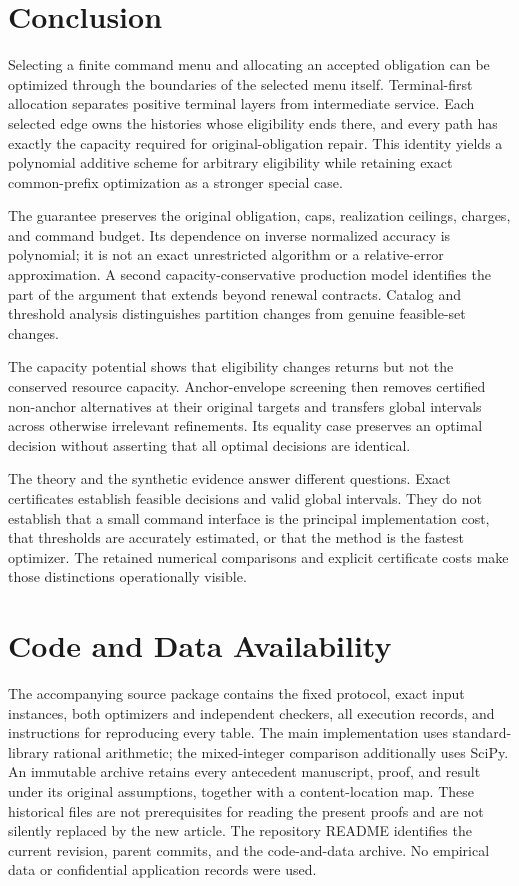 \section{Conclusion}
Selecting a finite command menu and allocating an accepted obligation can be optimized through the boundaries of the selected menu itself. Terminal-first allocation separates positive terminal layers from intermediate service. Each selected edge owns the histories whose eligibility ends there, and every path has exactly the capacity required for original-obligation repair. This identity yields a polynomial additive scheme for arbitrary eligibility while retaining exact common-prefix optimization as a stronger special case.

The guarantee preserves the original obligation, caps, realization ceilings, charges, and command budget. Its dependence on inverse normalized accuracy is polynomial; it is not an exact unrestricted algorithm or a relative-error approximation. A second capacity-conservative production model identifies the part of the argument that extends beyond renewal contracts. Catalog and threshold analysis distinguishes partition changes from genuine feasible-set changes.

The capacity potential shows that eligibility changes returns but not the conserved resource capacity. Anchor-envelope screening then removes certified non-anchor alternatives at their original targets and transfers global intervals across otherwise irrelevant refinements. Its equality case preserves an optimal decision without asserting that all optimal decisions are identical.

The theory and the synthetic evidence answer different questions. Exact certificates establish feasible decisions and valid global intervals. They do not establish that a small command interface is the principal implementation cost, that thresholds are accurately estimated, or that the method is the fastest optimizer. The retained numerical comparisons and explicit certificate costs make those distinctions operationally visible.

\section*{Code and Data Availability}
The accompanying source package contains the fixed protocol, exact input instances, both optimizers and independent checkers, all execution records, and instructions for reproducing every table. The main implementation uses standard-library rational arithmetic; the mixed-integer comparison additionally uses SciPy. An immutable archive retains every antecedent manuscript, proof, and result under its original assumptions, together with a content-location map. These historical files are not prerequisites for reading the present proofs and are not silently replaced by the new article. The repository README identifies the current revision, parent commits, and the code-and-data archive. No empirical data or confidential application records were used.
